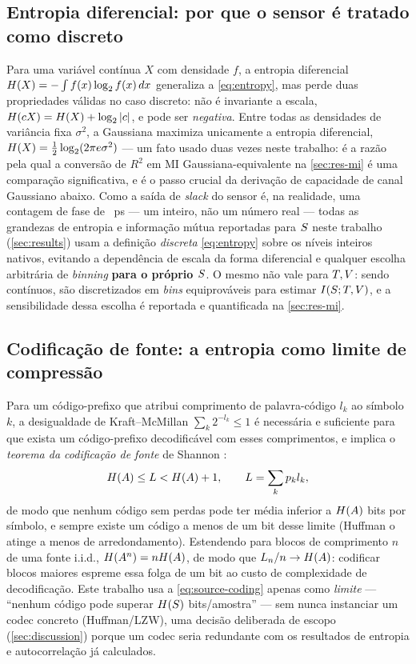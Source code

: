 \subsection{Entropia diferencial: por que o sensor é tratado como discreto}
\label{sec:th-diffent}
Para uma variável contínua $X$ com densidade $f$, a entropia diferencial
$H\!\left(X\right)=-\int f(x)\log_2 f(x)\,dx$ generaliza a \cref{eq:entropy}, mas perde
duas propriedades válidas no caso discreto: não é invariante a escala,
$H\!\left(cX\right)=H\!\left(X\right)+\log_2|c|$, e pode ser \emph{negativa}. Entre todas as
densidades de variância fixa $\sigma^2$, a Gaussiana maximiza unicamente a
entropia diferencial, $H\!\left(X\right)=\tfrac12\log_2(2\pi e\sigma^2)$ --- um fato
usado duas vezes neste trabalho: é a razão pela qual a conversão de $R^2$ em
MI Gaussiana-equivalente na \cref{sec:res-mi} é uma comparação significativa,
e é o passo crucial da derivação de capacidade de canal Gaussiano abaixo.
Como a saída de \emph{slack} do sensor é, na realidade, uma contagem de fase
de \valLSBps~ps --- um inteiro, não um número real --- todas as grandezas de
entropia e informação mútua reportadas para $S$ neste trabalho
(\cref{sec:results}) usam a definição \emph{discreta} \cref{eq:entropy} sobre
os níveis inteiros nativos, evitando a dependência de escala da forma
diferencial e qualquer escolha arbitrária de \emph{binning} \textbf{para o
próprio $S$}. O mesmo não vale para $T,V$: sendo contínuos, são
discretizados em \valMIbins{} \emph{bins} equiprováveis para estimar
$I\!\left(S ; T,V\right)$, e a sensibilidade dessa escolha é reportada e
quantificada na \cref{sec:res-mi}.

\subsection{Codificação de fonte: a entropia como limite de compressão}
\label{sec:th-source}
Para um código-prefixo que atribui comprimento de palavra-código $l_k$ ao
símbolo $k$, a desigualdade de Kraft--McMillan $\sum_k 2^{-l_k}\le1$ é
necessária e suficiente para que exista um código-prefixo decodificável com
esses comprimentos, e implica o \emph{teorema da codificação de fonte} de
Shannon \cite{cover2006}:
\begin{equation}
  H\!\left(A\right) \le L < H\!\left(A\right)+1, \qquad L=\sum_k p_k l_k,
  \label{eq:source-coding}
\end{equation}
de modo que nenhum código sem perdas pode ter média inferior a $H\!\left(A\right)$
bits por símbolo, e sempre existe um código a menos de um bit desse limite
(Huffman o atinge a menos de arredondamento). Estendendo para blocos de
comprimento $n$ de uma fonte i.i.d., $H\!\left(A^n\right)=nH\!\left(A\right)$, de modo que
$L_n/n\to H\!\left(A\right)$: codificar blocos maiores espreme essa folga de um bit ao
custo de complexidade de decodificação. Este trabalho usa a
\cref{eq:source-coding} apenas como \emph{limite} --- ``nenhum código pode
superar $H\!\left(S\right)$ bits/amostra'' --- sem nunca instanciar um codec
concreto (Huffman/LZW), uma decisão deliberada de escopo
(\cref{sec:discussion}) porque um codec seria redundante com os resultados
de entropia e autocorrelação já calculados.

